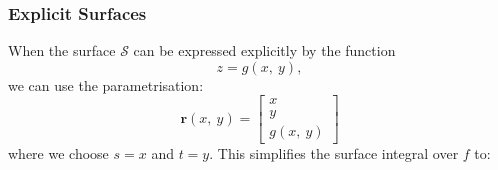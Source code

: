 \documentclass{article}
\begin{document}
\subsubsection{Explicit Surfaces}
When the surface \(\mathscr{S}\) can be expressed explicitly by the
function
\begin{equation*}
    z = g\left( x,\: y \right),
\end{equation*}
we can use the parametrisation:
\begin{equation*}
    \symbf{r}\left( x,\: y \right) =
    \begin{bmatrix}
        x \\
        y \\
        g\left( x,\: y \right)
    \end{bmatrix}
\end{equation*}
where we choose \(s = x\) and \(t = y\). This simplifies the surface
integral over \(f\) to:
\end{document}
